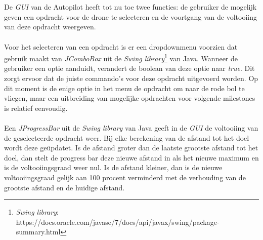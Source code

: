 \\
\\
De \textit{GUI} van de Autopilot heeft tot nu toe twee functies: de gebruiker de mogelijk geven een opdracht voor de drone te selecteren en de voortgang van de voltooiing van deze opdracht weergeven.
\\
\\
Voor het selecteren van een opdracht is er een dropdownmenu voorzien dat gebruik maakt van \textit{JComboBox} uit de \textit{Swing library}\footnote{\textit{Swing library}: https://docs.oracle.com/javase/7/docs/api/javax/swing/package-summary.html} van Java. Wanneer de gebruiker een optie aanduidt, verandert de boolean van deze optie naar \textit{true}. Dit zorgt ervoor dat de juiste commando's voor deze opdracht uitgevoerd worden. Op dit moment is de enige optie in het menu de opdracht om naar de rode bol te vliegen, maar een uitbreiding van mogelijke opdrachten voor volgende milestones is relatief eenvoudig.
\\
\\
Een \textit{JProgressBar} uit de \textit{Swing library} van Java geeft in de \textit{GUI} de voltooiing van de geselecteerde opdracht weer. Bij elke berekening van de afstand tot het doel wordt deze ge\"{u}pdatet. Is de afstand groter dan de laatste grootste afstand tot het doel, dan stelt de progress bar deze nieuwe afstand in als het nieuwe maximum en is de voltooiingsgraad weer nul. Is de afstand kleiner, dan is de nieuwe voltooiingsgraad gelijk aan 100 procent verminderd met de verhouding van de grootste afstand en de huidige afstand.  
